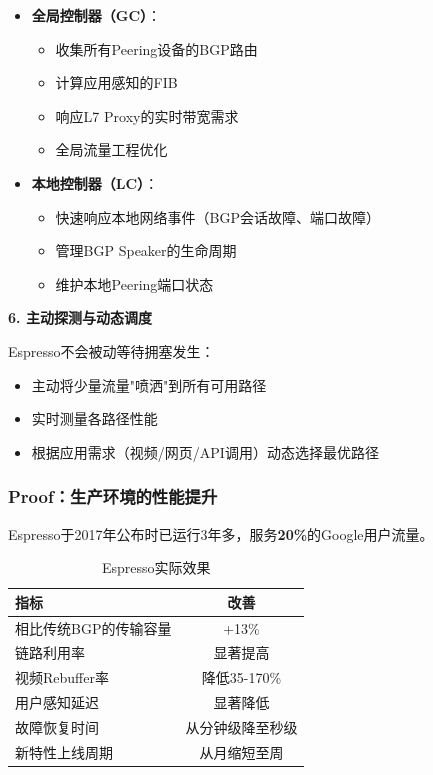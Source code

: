 \begin{itemize}
    \item \textbf{全局控制器（GC）}：
    \begin{itemize}
        \item 收集所有Peering设备的BGP路由
        \item 计算应用感知的FIB
        \item 响应L7 Proxy的实时带宽需求
        \item 全局流量工程优化
    \end{itemize}
    
    \item \textbf{本地控制器（LC）}：
    \begin{itemize}
        \item 快速响应本地网络事件（BGP会话故障、端口故障）
        \item 管理BGP Speaker的生命周期
        \item 维护本地Peering端口状态
    \end{itemize}
\end{itemize}

\textbf{6. 主动探测与动态调度}

Espresso不会被动等待拥塞发生：
\begin{itemize}
    \item 主动将少量流量"喷洒"到所有可用路径
    \item 实时测量各路径性能
    \item 根据应用需求（视频/网页/API调用）动态选择最优路径
\end{itemize}

\subsubsection{Proof：生产环境的性能提升}

Espresso于2017年公布时已运行3年多，服务\textbf{20\%}的Google用户流量。

\begin{table}[h]
\centering
\caption{Espresso实际效果}
\begin{tabular}{lc}
\toprule
\textbf{指标} & \textbf{改善} \\
\midrule
相比传统BGP的传输容量 & +13\% \\
链路利用率 & 显著提高 \\
视频Rebuffer率 & 降低35-170\% \\
用户感知延迟 & 显著降低 \\
故障恢复时间 & 从分钟级降至秒级 \\
新特性上线周期 & 从月缩短至周 \\
\bottomrule
\end{tabular}
\end{table}

